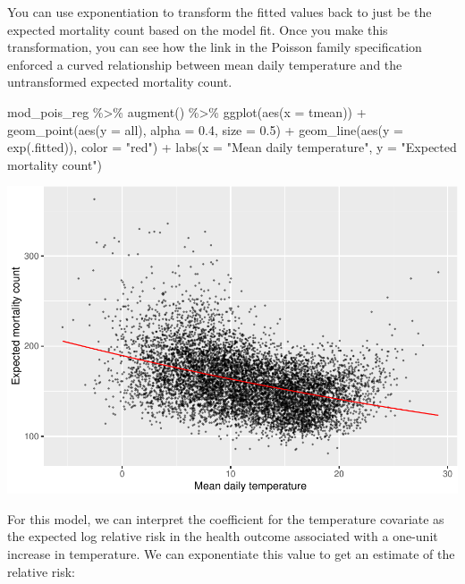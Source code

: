 \documentclass[
]{book}
\newenvironment{Shaded}{\begin{snugshade}}{\end{snugshade}}
\newcommand{\AttributeTok}[1]{\textcolor[rgb]{0.77,0.63,0.00}{#1}}
\newcommand{\FloatTok}[1]{\textcolor[rgb]{0.00,0.00,0.81}{#1}}
\newcommand{\FunctionTok}[1]{\textcolor[rgb]{0.00,0.00,0.00}{#1}}
\newcommand{\NormalTok}[1]{#1}
\newcommand{\SpecialCharTok}[1]{\textcolor[rgb]{0.00,0.00,0.00}{#1}}
\newcommand{\StringTok}[1]{\textcolor[rgb]{0.31,0.60,0.02}{#1}}
\begin{document}
You can use exponentiation to transform the fitted values back to just be the
expected mortality count based on the model fit. Once you make this
transformation, you can see how the link in the Poisson family specification
enforced a curved relationship between mean daily temperature and the
untransformed expected mortality count.

\begin{Shaded}
\begin{Highlighting}[]
\NormalTok{mod\_pois\_reg }\SpecialCharTok{\%\textgreater{}\%} 
  \FunctionTok{augment}\NormalTok{() }\SpecialCharTok{\%\textgreater{}\%} 
  \FunctionTok{ggplot}\NormalTok{(}\FunctionTok{aes}\NormalTok{(}\AttributeTok{x =}\NormalTok{ tmean)) }\SpecialCharTok{+} 
  \FunctionTok{geom\_point}\NormalTok{(}\FunctionTok{aes}\NormalTok{(}\AttributeTok{y =}\NormalTok{ all), }\AttributeTok{alpha =} \FloatTok{0.4}\NormalTok{, }\AttributeTok{size =} \FloatTok{0.5}\NormalTok{) }\SpecialCharTok{+} 
  \FunctionTok{geom\_line}\NormalTok{(}\FunctionTok{aes}\NormalTok{(}\AttributeTok{y =} \FunctionTok{exp}\NormalTok{(.fitted)), }\AttributeTok{color =} \StringTok{"red"}\NormalTok{) }\SpecialCharTok{+} 
  \FunctionTok{labs}\NormalTok{(}\AttributeTok{x =} \StringTok{"Mean daily temperature"}\NormalTok{, }\AttributeTok{y =} \StringTok{"Expected mortality count"}\NormalTok{)}
\end{Highlighting}
\end{Shaded}

\includegraphics{adv_epi_analysis_files/figure-latex/unnamed-chunk-33-1.pdf}

For this model, we can interpret the coefficient for the temperature covariate
as the expected log relative risk in the health outcome associated with a
one-unit increase in temperature. We can exponentiate this value to get an
estimate of the relative risk:
\end{document}

